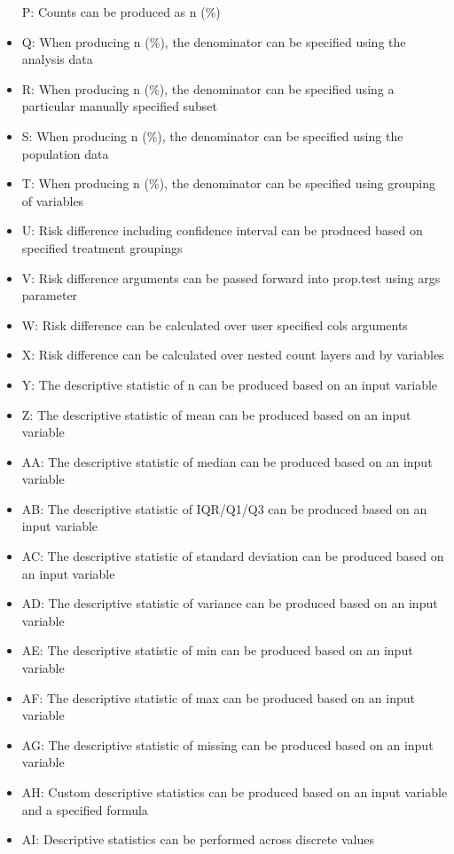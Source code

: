 \documentclass[
]{article}
\begin{document}
\begin{itemize}
  P: Counts can be produced as n (\%)
\item
  Q: When producing n (\%), the denominator can be specified using the
  analysis data
\item
  R: When producing n (\%), the denominator can be specified using a
  particular manually specified subset
\item
  S: When producing n (\%), the denominator can be specified using the
  population data
\item
  T: When producing n (\%), the denominator can be specified using
  grouping of variables
\item
  U: Risk difference including confidence interval can be produced based
  on specified treatment groupings
\item
  V: Risk difference arguments can be passed forward into prop.test
  using args parameter
\item
  W: Risk difference can be calculated over user specified cols
  arguments
\item
  X: Risk difference can be calculated over nested count layers and by
  variables
\item
  Y: The descriptive statistic of n can be produced based on an input
  variable
\item
  Z: The descriptive statistic of mean can be produced based on an input
  variable
\item
  AA: The descriptive statistic of median can be produced based on an
  input variable
\item
  AB: The descriptive statistic of IQR/Q1/Q3 can be produced based on an
  input variable
\item
  AC: The descriptive statistic of standard deviation can be produced
  based on an input variable
\item
  AD: The descriptive statistic of variance can be produced based on an
  input variable
\item
  AE: The descriptive statistic of min can be produced based on an input
  variable
\item
  AF: The descriptive statistic of max can be produced based on an input
  variable
\item
  AG: The descriptive statistic of missing can be produced based on an
  input variable
\item
  AH: Custom descriptive statistics can be produced based on an input
  variable and a specified formula
\item
  AI: Descriptive statistics can be performed across discrete values

\end{itemize}
\end{document}
